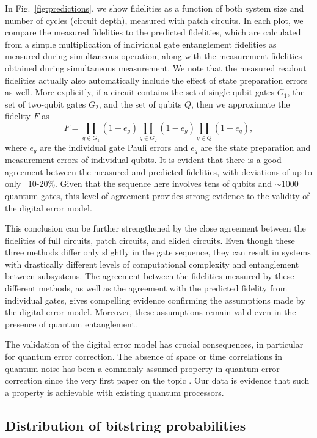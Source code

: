 In Fig.~\ref{fig:predictions}, we show fidelities as a function of both system size and number of cycles (circuit depth), measured with patch circuits. In each plot, we compare the measured fidelities to the predicted fidelities, which are calculated from a simple multiplication of individual gate entanglement fidelities as measured during simultaneous operation, along with the measurement fidelities obtained during simultaneous measurement. We note that the measured readout fidelities actually also automatically include the effect of state preparation errors as well. More explicitly, if a circuit contains the set of single-qubit gates $G_1$, the set of two-qubit gates $G_2$, and the set of qubits $Q$, then we approximate the fidelity $F$ as 
\begin{equation}
F = \prod_{g \in G_1} (1 - e_g) \prod_{g \in G_2} (1 - e_g) \prod_{q \in Q} (1 - {e_q}),
\end{equation}
where $e_g$ are the individual gate Pauli errors and $e_q$ are the state preparation and measurement errors of individual qubits. It is evident that there is a good agreement between the measured and predicted fidelities, with deviations of up to only ~10-20\%. Given that the sequence here involves tens of qubits and $\sim1000$ quantum gates, this level of agreement provides strong evidence to the validity of the digital error model.

This conclusion can be further strengthened by the close agreement between the fidelities of full circuits, patch circuits, and elided circuits.  Even though these three methods differ only slightly in the gate sequence, they can result in systems with drastically different levels of computational complexity and entanglement between subsystems. The agreement between the fidelities measured by these different methods, as well as the agreement with the predicted fidelity from individual gates, gives compelling evidence confirming the assumptions made by the digital error model. Moreover, these assumptions remain valid even in the presence of quantum entanglement. 

The validation of the digital error model has crucial consequences, in particular for quantum error correction. The absence of space or time correlations in quantum noise has been a commonly assumed property in quantum error correction since the very first paper on the topic \cite{shor1995scheme}. Our data is evidence that such a property is achievable with existing quantum processors. 

\subsection{Distribution of bitstring probabilities}
\label{subsec:xeb_distribution_and_ks_test}

